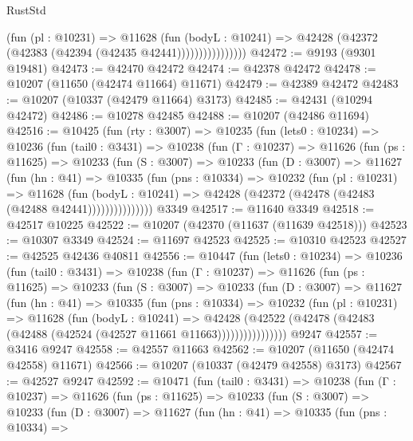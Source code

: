 \begin{lexlean}{RustStd}
\begin{coremodule}
                        (fun (pl : @10231) =>
                        @11628
                          (fun (bodyL : @10241) =>
                          @42428 (@42372 (@42383 (@42394 (@42435 @42441))))))))))))))))
@42472 := @9193 (@9301 @19481)
@42473 := @42470 @42472
@42474 := @42378 @42472
@42478 := @10207 (@11650 (@42474 @11664) @11671)
@42479 := @42389 @42472
@42483 := @10207 (@10337 (@42479 @11664) @3173)
@42485 := @42431 (@10294 @42472)
@42486 := @10278 @42485
@42488 := @10207 (@42486 @11694)
@42516 := @10425
    (fun (rty : @3007) =>
    @10235
      (fun (lets0 : @10234) =>
      @10236
        (fun (tail0 : @3431) =>
        @10238
          (fun (Γ : @10237) =>
          @11626
            (fun (ps : @11625) =>
            @10233
              (fun (S : @3007) =>
              @10233
                (fun (D : @3007) =>
                @11627
                  (fun (hn : @41) =>
                  @10335
                    (fun (pns : @10334) =>
                    @10232
                      (fun (pl : @10231) =>
                      @11628
                        (fun (bodyL : @10241) =>
                        @42428 (@42372 (@42478 (@42483 (@42488 @42441)))))))))))))))
    @3349
@42517 := @11640 @3349
@42518 := @42517 @10225
@42522 := @10207 (@42370 (@11637 (@11639 @42518)))
@42523 := @10307 @3349
@42524 := @11697 @42523
@42525 := @10310 @42523
@42527 := @42525 @42436 @40811
@42556 := @10447
    (fun (lets0 : @10234) =>
    @10236
      (fun (tail0 : @3431) =>
      @10238
        (fun (Γ : @10237) =>
        @11626
          (fun (ps : @11625) =>
          @10233
            (fun (S : @3007) =>
            @10233
              (fun (D : @3007) =>
              @11627
                (fun (hn : @41) =>
                @10335
                  (fun (pns : @10334) =>
                  @10232
                    (fun (pl : @10231) =>
                    @11628
                      (fun (bodyL : @10241) =>
                      @42428
                        (@42522
                          (@42478 (@42483 (@42488 (@42524 (@42527 @11661 @11663))))))))))))))))
    @9247
@42557 := @3416 @9247
@42558 := @42557 @11663
@42562 := @10207 (@11650 (@42474 @42558) @11671)
@42566 := @10207 (@10337 (@42479 @42558) @3173)
@42567 := @42527 @9247
@42592 := @10471
    (fun (tail0 : @3431) =>
    @10238
      (fun (Γ : @10237) =>
      @11626
        (fun (ps : @11625) =>
        @10233
          (fun (S : @3007) =>
          @10233
            (fun (D : @3007) =>
            @11627
              (fun (hn : @41) =>
              @10335
                (fun (pns : @10334) =>

\end{coremodule}
\end{lexlean}
